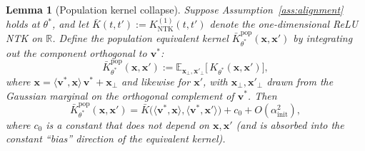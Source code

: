 \documentclass[12pt]{amsart}
\newtheorem{lemma}[theorem]{Lemma}
\theoremstyle{definition}
\theoremstyle{remark}
\newcommand{\R}{\mathbb{R}}
\newcommand{\E}{\mathbb{E}}
\newcommand{\bx}{\mathbf{x}}
\newcommand{\bv}{\mathbf{v}}
\begin{document}
\begin{lemma}[Population kernel collapse]\label{lem:kernel-collapse}
Suppose Assumption~\ref{ass:alignment} holds at $\theta^{*}$, and let
$\bar K(t,t') := K_{\mathrm{NTK}}^{(1)}(t,t')$ denote the one-dimensional
ReLU NTK on $\R$. Define the \emph{population equivalent kernel}
$\bar K^{\mathrm{pop}}_{\theta^{*}}(\bx,\bx')$ by integrating out the
component orthogonal to $\bv^{*}$:
\[
  \bar K^{\mathrm{pop}}_{\theta^{*}}(\bx,\bx')
  := \E_{\bx_{\perp},\bx'_{\perp}}\!\bigl[\,K_{\theta^{*}}(\bx,\bx')\bigr],
\]
where $\bx = \langle\bv^{*},\bx\rangle\,\bv^{*} + \bx_{\perp}$ and likewise
for $\bx'$, with $\bx_{\perp},\bx'_{\perp}$ drawn from the Gaussian marginal
on the orthogonal complement of $\bv^{*}$. Then
\[
  \bar K^{\mathrm{pop}}_{\theta^{*}}(\bx, \bx')
  = \bar K\bigl(\langle \bv^{*}, \bx\rangle, \langle \bv^{*}, \bx'\rangle\bigr)
  + c_{0} + O(\alpha_{\mathrm{init}}^{2}),
\]
where $c_{0}$ is a constant that does not depend on $\bx,\bx'$ (and is
absorbed into the constant ``bias'' direction of the equivalent kernel).
\end{lemma}
\end{document}
